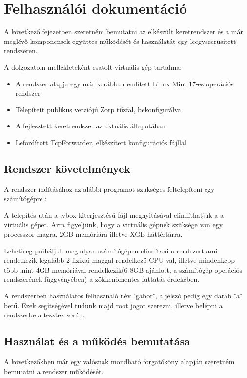 \documentclass[a4paper,12pt,oneside]{report}
\begin{document}
\section{Felhasználói dokumentáció}

A következő fejezetben szeretném bemutatni az elkészült keretrendszer és a már meglévő komponensek együttes működését és használatát egy leegyszerüsített rendszeren.

A dolgozatom mellékleteként csatolt virtuális gép tartalma:
\begin{itemize}
	\itemsep0em
		\item A rendszer alapja egy már korábban említett Linux Mint 17-es operációs rendszer
		\item Telepített publikus verziójú Zorp tűzfal, bekonfigurálva
		\item A fejlesztett keretrendszer az aktuális állapotában
		\item Lefordított TcpForwarder, elkészített konfigurációs fájllal
\end{itemize}

\subsection{Rendszer követelmények}

A rendszer indításához az alábbi programot szükséges feltelepíteni egy számítógépre : \cite{website:vbox}

A telepítés után a .vbox kiterjesztésű fájl megnyitásával elindíthatjuk a a virtuális gépet.
Arra figyeljünk, hogy a virtuális gépnek szüksége van egy processzor magra, 2GB memóriára illetve XGB háttértárra.

Lehetőleg próbáljuk meg olyan számítógépen elindítani a rendszert ami rendelkezik legalább 2 fizikai maggal rendelkező CPU-val, illetve mindenképp több mint 4GB memóriával rendelkezik(6-8GB ajánlott, a számítógép operációs rendszerének függvényében) a zökkenőmentes futtatás érdekében.

A rendszerben használatos felhasználó név "gabor", a jelszó pedig egy darab "a" betű. Ezek segítségével tudunk majd root jogot szerezni, illetve belépni a rendszerbe a tesztek során.

\subsection{Használat és a működés bemutatása}

A következőkben már egy valósnak mondható forgatóköny alapján szeretném bemutatni a rendszer működését.
\end{document}
